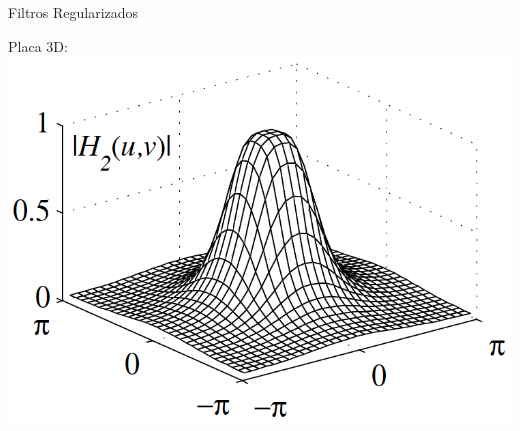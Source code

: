 \documentclass[]{beamer}
\begin{document}
\begin{frame}{Filtros Regularizados}
\begin{center}

Placa 3D:\\
\includegraphics[scale=0.6]{Images/FrecuenciaPlaca3D.png}

\end{center}
\end{frame}
\end{document}
